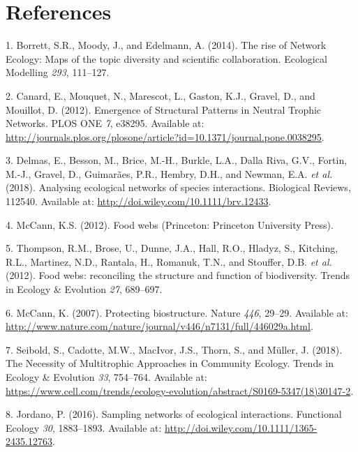 \documentclass[12pt]{article}
\begin{document}
\hypertarget{references}{%
\section*{References}\label{references}}

\hypertarget{refs}{}
\begin{cslreferences}
\leavevmode\hypertarget{ref-BorrMood14}{}%
1. Borrett, S.R., Moody, J., and Edelmann, A. (2014). The rise of
Network Ecology: Maps of the topic diversity and scientific
collaboration. Ecological Modelling \emph{293}, 111--127.

\leavevmode\hypertarget{ref-cana12esp}{}%
2. Canard, E., Mouquet, N., Marescot, L., Gaston, K.J., Gravel, D., and
Mouillot, D. (2012). Emergence of Structural Patterns in Neutral Trophic
Networks. PLOS ONE \emph{7}, e38295. Available at:
\url{http://journals.plos.org/plosone/article?id=10.1371/journal.pone.0038295}.

\leavevmode\hypertarget{ref-DelmBess18}{}%
3. Delmas, E., Besson, M., Brice, M.-H., Burkle, L.A., Dalla Riva, G.V.,
Fortin, M.-J., Gravel, D., Guimarães, P.R., Hembry, D.H., and Newman,
E.A. \emph{et al.} (2018). Analysing ecological networks of species
interactions. Biological Reviews, 112540. Available at:
\url{http://doi.wiley.com/10.1111/brv.12433}.

\leavevmode\hypertarget{ref-McCa12}{}%
4. McCann, K.S. (2012). Food webs (Princeton: Princeton University
Press).

\leavevmode\hypertarget{ref-ThomBros12}{}%
5. Thompson, R.M., Brose, U., Dunne, J.A., Hall, R.O., Hladyz, S.,
Kitching, R.L., Martinez, N.D., Rantala, H., Romanuk, T.N., and
Stouffer, D.B. \emph{et al.} (2012). Food webs: reconciling the
structure and function of biodiversity. Trends in Ecology \& Evolution
\emph{27}, 689--697.

\leavevmode\hypertarget{ref-McCa07}{}%
6. McCann, K. (2007). Protecting biostructure. Nature \emph{446},
29--29. Available at:
\url{http://www.nature.com/nature/journal/v446/n7131/full/446029a.html}.

\leavevmode\hypertarget{ref-SeibCado18}{}%
7. Seibold, S., Cadotte, M.W., MacIvor, J.S., Thorn, S., and Müller, J.
(2018). The Necessity of Multitrophic Approaches in Community Ecology.
Trends in Ecology \& Evolution \emph{33}, 754--764. Available at:
\url{https://www.cell.com/trends/ecology-evolution/abstract/S0169-5347(18)30147-2}.

\leavevmode\hypertarget{ref-Jord16a}{}%
8. Jordano, P. (2016). Sampling networks of ecological interactions.
Functional Ecology \emph{30}, 1883--1893. Available at:
\url{http://doi.wiley.com/10.1111/1365-2435.12763}.


\end{cslreferences}
\end{document}
